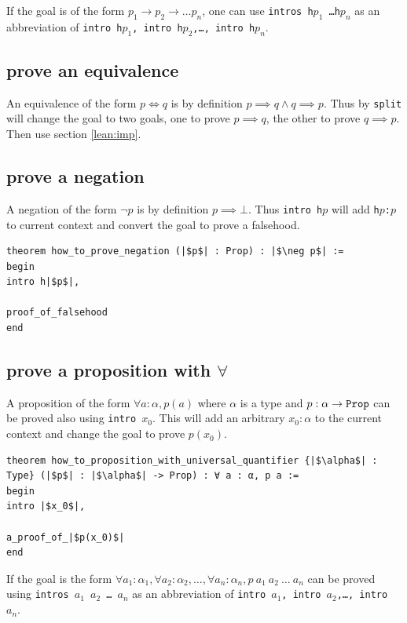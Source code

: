 \documentclass{report}
\theoremstyle{definition}
\begin{document}
If the goal is of the form $p_1\to p_2\to\dots p_n$, one can use {\tt \small intros h$p_1$ \dots h$p_n$} as an abbreviation of {\tt \small intro h$p_1$, intro h$p_2$,\dots, intro h$p_n$}.


\subsection{prove an equivalence}\label{lean:eqv}
An equivalence of the form $p \iff q$ is by definition $p\implies q \land q\implies p$. Thus by {\tt \small split} will change the goal to two goals, one to prove $p\implies q$, the other to prove $q \implies p$. Then use section \ref{lean:imp}.

\subsection{prove a negation}
A negation of the form $\neg p$ is by definition $p \implies \bot$. Thus {\tt \small intro h$p$} will add {\tt \small h$p$:$p$} to current context and convert the goal to prove a falsehood.

\begin{verbatim}
theorem how_to_prove_negation (|$p$| : Prop) : |$\neg p$| :=
begin
intro h|$p$|,

proof_of_falsehood
end
\end{verbatim}

\subsection{prove a proposition with $\forall$}\label{lean:forall}
A proposition of the form $\forall a : \alpha, p(a)$ where $\alpha$ is a type and $p : \alpha\to {\tt \small Prop}$ can be proved also using {\tt \small intro $x_0$}. This will add an arbitrary $x_0:\alpha$ to the current context and change the goal to prove $p(x_0)$.

\begin{verbatim}
theorem how_to_proposition_with_universal_quantifier {|$\alpha$| : Type} (|$p$| : |$\alpha$| -> Prop) : ∀ a : α, p a :=
begin
intro |$x_0$|,

a_proof_of_|$p(x_0)$|
end
\end{verbatim}

If the goal is the form $\forall a_1:\alpha_1,\forall a_2:\alpha_2,\dots,\forall a_n:\alpha_n, p\ a_1\ a_2\ \dots\ a_n$ can be proved using {\tt \small intros $a_1$ $a_2$ \dots\  $a_n$} as an abbreviation of {\tt \small intro $a_1$, intro $a_2$,\dots, intro $a_n$}.
\end{document}
